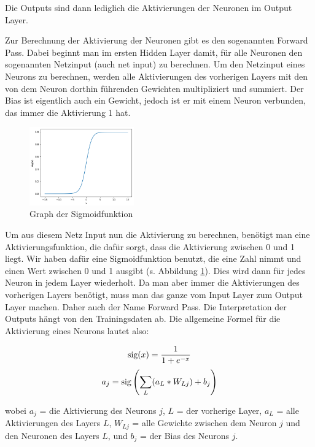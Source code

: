 \documentclass{scrartcl}
\begin{document}
	Die Outputs sind dann lediglich die Aktivierungen der Neuronen im Output Layer.


	Zur Berechnung der Aktivierung der Neuronen gibt es den sogenannten Forward Pass. Dabei beginnt man im ersten Hidden Layer damit, für alle Neuronen den sogenannten Netzinput (auch net input) zu berechnen. Um den Netzinput eines Neurons zu berechnen, werden alle Aktivierungen des vorherigen Layers mit den von dem Neuron dorthin führenden Gewichten multipliziert und summiert. Der Bias ist eigentlich auch ein Gewicht, jedoch ist er mit einem Neuron verbunden, das immer die Aktivierung 1 hat.

	\newpage

	\begin{figure}
		\centering
		\includegraphics[width=0.4\textwidth]{pictures/sig_func.png}
		\caption{Graph der Sigmoidfunktion}
		\label{sig_func}
	\end{figure}

	Um aus diesem Netz Input nun die Aktivierung zu berechnen, benötigt man eine Aktivierungsfunktion, die dafür sorgt, dass die Aktivierung zwischen 0 und 1 liegt. Wir haben dafür eine Sigmoidfunktion benutzt, die eine Zahl nimmt und einen Wert zwischen 0 und 1 ausgibt (s. Abbildung \ref{sig_func}). Dies wird dann für jedes Neuron in jedem Layer wiederholt. Da man aber immer die Aktivierungen des vorherigen Layers benötigt, muss man das ganze vom Input Layer zum Output Layer machen. Daher auch der Name Forward Pass. Die Interpretation der Outputs hängt von den Trainingsdaten ab. Die allgemeine Formel für die Aktivierung eines Neurons lautet also:


	{\Large
	\[
		\textrm{sig}(x)=\frac{1}{1+e^{-x}}
		\]
	\[
		a_{j} = \textrm{sig}\left(\sum_{L} (a_{L} * W_{Lj}) + b_{j}\right)
		\]}
	
	\noindent wobei $a_j$ = die Aktivierung des Neurons $j$, $L$ = der vorherige Layer, $a_L$ = alle Aktivierungen des Layers $L$, $W_{Lj}$ = alle Gewichte zwischen dem Neuron $j$ und den Neuronen des Layers $L$, und $b_j$ = der Bias des Neurons $j$. \cite{brotcrunsher:forwardpass}	
	
\end{document}
